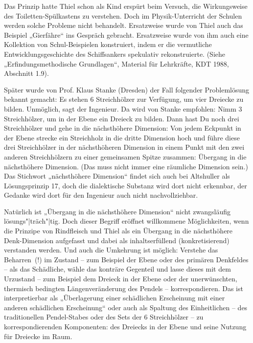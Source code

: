 \documentclass[12pt,a4paper]{article}
\begin{document}
Das Prinzip hatte Thiel schon als Kind erspürt beim Versuch, die Wirkungsweise
des Toiletten-Spülkastens zu verstehen. Doch im Physik-Unterricht der Schulen
werden solche Probleme nicht behandelt.  Ersatzweise wurde von Thiel auch das
Beispiel „Gierfähre“ ins Gespräch gebracht. Ersatzweise wurde von ihm auch eine
Kollektion von Schul-Beispielen konstruiert, indem er die vermutliche
Entwicklungsgeschichte des Schiffsankers spekulativ rekonstruierte. (Siehe
„Erfindungsmethodische Grundlagen“, Material für Lehrkräfte, KDT 1988,
Abschnitt 1.9).

Später wurde von Prof. Klaus Stanke (Dresden) der Fall folgender Problemlösung
bekannt gemacht: Es stehen 6 Streichhölzer zur Verfügung, um vier Dreiecke zu
bilden. Unmöglich, sagt der Ingenieur. Da wird von Stanke empfohlen: Nimm 3
Streichhölzer, um in der Ebene ein Dreieck zu bilden. Dann hast Du noch drei
Streichhölzer und gehe in die nächsthöhere Dimension: Von jedem Eckpunkt in der
Ebene strecke ein Streichholz in die dritte Dimension hoch und führe diese drei
Streichhölzer in der nächsthöheren Dimension in einem Punkt mit den zwei
anderen Streichhölzern zu einer gemeinsamen Spitze zusammen: Übergang in die
nächsthöhere Dimension. (Das muss nicht immer eine räumliche Dimension sein.)
Das Stichwort „nächsthöhere Dimension“ findet sich auch bei Altshuller als
Lösungsprinzip 17, doch die dialektische Substanz wird dort nicht erkennbar,
der Gedanke wird dort für den Ingenieur auch nicht nachvollziehbar.

Natürlich ist „Übergang in die nächsthöhere Dimension“ nicht zwangsläufig
lösungs"|träch"|tig. Doch dieser Begriff eröffnet willkommene Möglichkeiten,
wenn die Prinzipe von Rindfleisch und Thiel als ein Übergang in die
nächsthöhere Denk-Dimension aufgefasst und dabei als inhaltserfüllend
(konkretisierend) verstanden werden. Und auch die Umkehrung ist möglich:
Verstehe das Beharren~(!) im Zustand – zum Beispiel der Ebene oder des primären
Denkfeldes -- als das Schädliche, wähle das konträre Gegenteil und lasse dieses
mit dem Urzustand – zum Beispiel dem Dreieck in der Ebene oder der
unerwünschten, thermisch bedingten Längenveränderung des Pendels –
korrespondieren. Das ist interpretierbar als „Überlagerung einer schädlichen
Erscheinung mit einer anderen schädlichen Erscheinung“ oder auch als Spaltung
des Einheitlichen – des traditionellen Pendel-Stabes oder des Sets der 6
Streichhölzer -- zu korrespondierenden Komponenten: des Dreiecks in der Ebene
und seine Nutzung für Dreiecke im Raum.
\end{document}
